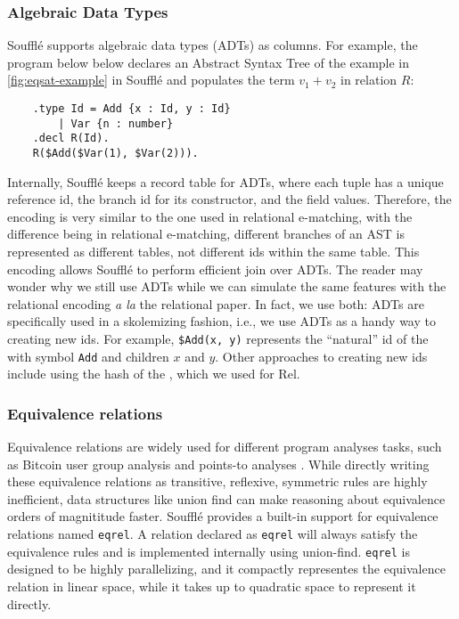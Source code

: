 \subsubsection*{Algebraic Data Types}
Souffl\'e supports algebraic data types (ADTs) as columns.
For example, the program below below declares 
 an Abstract Syntax Tree of the example in \autoref{fig:eqsat-example}
 in Souffl\'e
 and populates the term $v_1+v_2$ in relation $R$:
\begin{verbatim}
    .type Id = Add {x : Id, y : Id}
        | Var {n : number}
    .decl R(Id).
    R($Add($Var(1), $Var(2))).
\end{verbatim}

Internally, Souffl\'e keeps a record table for ADTs, 
 where each tuple has a unique reference id, 
 the branch id for its constructor, and
 the field values.
Therefore, 
 the encoding is very similar to the one used 
 in relational e-matching, with the difference being
 in relational e-matching, different branches of an AST
 is represented as different tables, 
 not different ids within the same table.
This encoding allows Souffl\'e to 
 perform efficient join over ADTs.
The reader may wonder 
 why we still use ADTs while we can 
 simulate the same features with 
 the relational encoding 
 \textit{a la} the relational \ematching paper.
In fact,
 we use both:
 ADTs are specifically used in a skolemizing fashion,
 i.e., we use ADTs as a handy way to creating new \eclass ids.
For example, \verb|$Add(x, y)| represents the ``natural'' \eclass id
 of the \enode with symbol \verb|Add| and children $x$ and $y$.
Other approaches to creating new \eclass ids include 
 using the hash of the \enodes, which we used for Rel.

\def\eqrel{\texttt{eqrel}}

\subsubsection*{Equivalence relations}
Equivalence relations are widely used 
 for different program analyses tasks, 
 such as Bitcoin user group analysis \citep{anonymity-bitcoin} 
 and points-to analyses \citep{multi-alaias-analysis,points-to-linear}.
While directly writing these equivalence relations as
 transitive, reflexive, symmetric rules are highly inefficient,
 data structures like union find \citep{unionfind} can 
 make reasoning about equivalence orders of magnititude faster.
Souffl\'e provides a built-in support for 
 equivalence relations named \eqrel. 
A relation declared as \eqrel{} will
 always satisfy the equivalence rules 
 and is implemented internally using union-find.
\eqrel{} is designed to be highly parallelizing, 
 and it compactly representes the equivalence relation
 in linear space, while it takes up to quadratic space
 to represent it directly.

